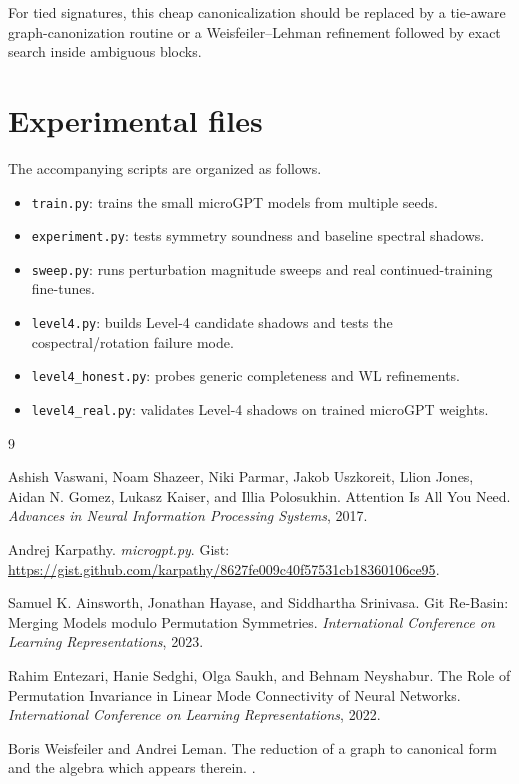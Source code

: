 \documentclass[11pt]{article}
\begin{document}
For tied signatures, this cheap canonicalization should be replaced by a tie-aware graph-canonization routine or a Weisfeiler--Lehman refinement followed by exact search inside ambiguous blocks.

\section{Experimental files}

The accompanying scripts are organized as follows.
\begin{itemize}[leftmargin=2em]
\item \texttt{train.py}: trains the small microGPT models from multiple seeds.
\item \texttt{experiment.py}: tests symmetry soundness and baseline spectral shadows.
\item \texttt{sweep.py}: runs perturbation magnitude sweeps and real continued-training fine-tunes.
\item \texttt{level4.py}: builds Level-4 candidate shadows and tests the cospectral/rotation failure mode.
\item \texttt{level4\_honest.py}: probes generic completeness and WL refinements.
\item \texttt{level4\_real.py}: validates Level-4 shadows on trained microGPT weights.
\end{itemize}

\begin{thebibliography}{9}

Ashish Vaswani, Noam Shazeer, Niki Parmar, Jakob Uszkoreit, Llion Jones, Aidan N. Gomez, Lukasz Kaiser, and Illia Polosukhin.
\newblock Attention Is All You Need.
\newblock \emph{Advances in Neural Information Processing Systems}, 2017.

Andrej Karpathy.
\newblock \emph{microgpt.py}.
\newblock Gist: \url{https://gist.github.com/karpathy/8627fe009c40f57531cb18360106ce95}.

Samuel K. Ainsworth, Jonathan Hayase, and Siddhartha Srinivasa.
\newblock Git Re-Basin: Merging Models modulo Permutation Symmetries.
\newblock \emph{International Conference on Learning Representations}, 2023.

Rahim Entezari, Hanie Sedghi, Olga Saukh, and Behnam Neyshabur.
\newblock The Role of Permutation Invariance in Linear Mode Connectivity of Neural Networks.
\newblock \emph{International Conference on Learning Representations}, 2022.

Boris Weisfeiler and Andrei Leman.
\newblock The reduction of a graph to canonical form and the algebra which appears therein.
.

\end{thebibliography}
\end{document}
